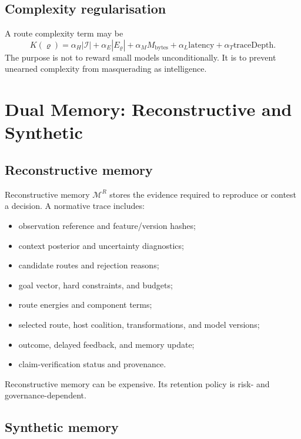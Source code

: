 \documentclass[10pt]{article}
\newcommand{\M}{\mathcal{M}}
\begin{document}
\subsection{Complexity regularisation}

A route complexity term may be
\begin{equation}
  K(\varrho)=\alpha_H |\mathcal{I}|+\alpha_E|E_\varrho|+\alpha_M M_{\mathrm{bytes}}+\alpha_L\mathrm{latency}+\alpha_T\mathrm{traceDepth}.
  \label{eq:routecomplexity}
\end{equation}
The purpose is not to reward small models unconditionally. It is to prevent unearned complexity from masquerading as intelligence.

\section{Dual Memory: Reconstructive and Synthetic}

\subsection{Reconstructive memory}

Reconstructive memory $\M^R$ stores the evidence required to reproduce or contest a decision. A normative trace includes:
\begin{itemize}
  \item observation reference and feature/version hashes;
  \item context posterior and uncertainty diagnostics;
  \item candidate routes and rejection reasons;
  \item goal vector, hard constraints, and budgets;
  \item route energies and component terms;
  \item selected route, host coalition, transformations, and model versions;
  \item outcome, delayed feedback, and memory update;
  \item claim-verification status and provenance.
\end{itemize}

Reconstructive memory can be expensive. Its retention policy is risk- and governance-dependent.

\subsection{Synthetic memory}
\end{document}
